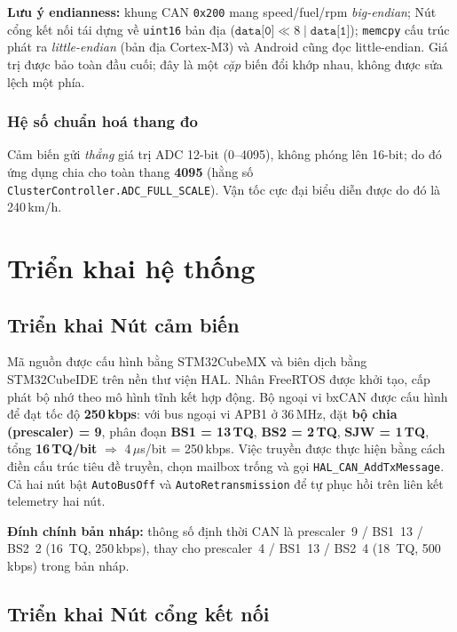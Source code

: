 \documentclass[../DoAn.tex]{subfiles}
\begin{document}
\noindent\textbf{Lưu ý endianness:} khung CAN \texttt{0x200} mang speed/fuel/rpm
\emph{big-endian}; Nút cổng kết nối tái dựng về \texttt{uint16} bản địa
($\texttt{data[0]}\ll8 \mid \texttt{data[1]}$); \texttt{memcpy} cấu trúc phát ra
\emph{little-endian} (bản địa Cortex-M3) và Android cũng đọc little-endian. Giá
trị được bảo toàn đầu cuối; đây là một \emph{cặp} biến đổi khớp nhau, không được
sửa lệch một phía.

\subsubsection*{Hệ số chuẩn hoá thang đo}

Cảm biến gửi \emph{thẳng} giá trị ADC 12-bit (0--4095), không phóng lên 16-bit;
do đó ứng dụng chia cho toàn thang \textbf{4095} (hằng số
\texttt{ClusterController.ADC\_FULL\_SCALE}). Vận tốc cực đại biểu diễn được do
đó là 240\,km/h.

\section{Triển khai hệ thống}
\label{section:4.3}

\subsection{Triển khai Nút cảm biến}
\label{section:4.3.1}

Mã nguồn được cấu hình bằng STM32CubeMX và biên dịch bằng STM32CubeIDE trên nền
thư viện HAL. Nhân FreeRTOS được khởi tạo, cấp phát bộ nhớ theo mô hình tĩnh kết
hợp động. Bộ ngoại vi bxCAN được cấu hình để đạt tốc độ \textbf{250\,kbps}: với
bus ngoại vi APB1 ở 36\,MHz, đặt \textbf{bộ chia (prescaler) = 9}, phân đoạn
\textbf{BS1 = 13\,TQ}, \textbf{BS2 = 2\,TQ}, \textbf{SJW = 1\,TQ}, tổng
\textbf{16\,TQ/bit} $\Rightarrow$ 4\,$\mu$s/bit = 250\,kbps. Việc truyền được
thực hiện bằng cách điền cấu trúc tiêu đề truyền, chọn mailbox trống và gọi
\texttt{HAL\_CAN\_AddTxMessage}. Cả hai nút bật \texttt{AutoBusOff} và
\texttt{AutoRetransmission} để tự phục hồi trên liên kết telemetry hai nút.

\medskip
\noindent\textbf{Đính chính bản nháp:} thông số định thời CAN là
prescaler~9 / BS1~13 / BS2~2 (16~TQ, 250\,kbps), thay cho prescaler~4 / BS1~13 /
BS2~4 (18~TQ, 500\,kbps) trong bản nháp.

\subsection{Triển khai Nút cổng kết nối}
\label{section:4.3.2}
\end{document}
